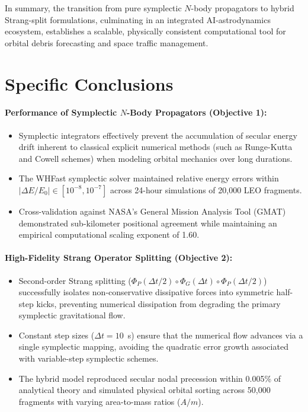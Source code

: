 In summary, the transition from pure symplectic $N$-body propagators to hybrid Strang-split formulations, culminating in an integrated AI-astrodynamics ecosystem, establishes a scalable, physically consistent computational tool for orbital debris forecasting and space traffic management.

\section{Specific Conclusions}

\paragraph{Performance of Symplectic $N$-Body Propagators (Objective 1):}
\begin{itemize}
    \item Symplectic integrators effectively prevent the accumulation of secular energy drift inherent to classical explicit numerical methods (such as Runge-Kutta and Cowell schemes) when modeling orbital mechanics over long durations.
    \item The WHFast symplectic solver maintained relative energy errors within $\vert{}\Delta E/E_0\vert{} \in [10^{-8}, 10^{-7}]$ across 24-hour simulations of 20,000 LEO fragments.
    \item Cross-validation against NASA's General Mission Analysis Tool (GMAT) demonstrated sub-kilometer positional agreement while maintaining an empirical computational scaling exponent of 1.60.
\end{itemize}

\paragraph{High-Fidelity Strang Operator Splitting (Objective 2):}
\begin{itemize}
    \item Second-order Strang splitting ($\Phi_P(\Delta t/2) \circ \Phi_G(\Delta t) \circ \Phi_P(\Delta t/2)$) successfully isolates non-conservative dissipative forces into symmetric half-step kicks, preventing numerical dissipation from degrading the primary symplectic gravitational flow.
    \item Constant step sizes ($\Delta t = 10$~s) ensure that the numerical flow advances via a single symplectic mapping, avoiding the quadratic error growth associated with variable-step symplectic schemes.
    \item The hybrid model reproduced secular nodal precession within 0.005\% of analytical theory and simulated physical orbital sorting across 50,000 fragments with varying area-to-mass ratios ($A/m$).
\end{itemize}

